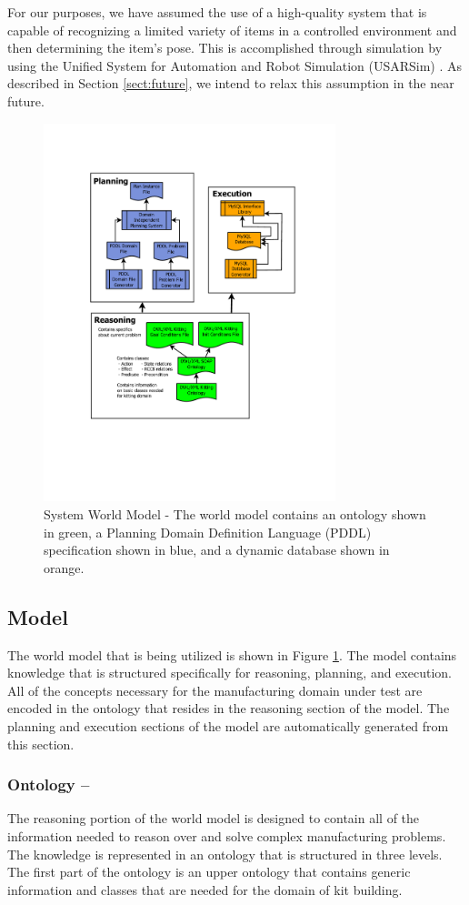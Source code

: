 For our purposes, 
we have assumed the use of a high-quality
system that is capable of recognizing a limited variety of items in a controlled environment and then determining the item's pose. This is accomplished through
simulation by using the Unified System for Automation and Robot Simulation (USARSim) \cite{Balakirsky2007}. As described in Section \ref{sect:future}, 
we intend to relax this assumption in the near future.
%
\begin{figure}[htb!]
\begin{center}
\includegraphics[width=8.5cm]{images/RITAWorldModel.pdf}
\caption{System World Model - The world model contains an ontology shown in green,
a Planning Domain Definition Language (PDDL) specification shown in blue, and a dynamic database shown in orange.}
\label{fig:WorldModel}
\end{center}
\end{figure}
%
\subsection{Model}
\label{subsection:Model}
The world model that is being utilized is shown in Figure \ref{fig:WorldModel}. The model contains knowledge that is structured specifically for
reasoning, planning, and execution. All of the concepts necessary for the manufacturing domain under test are
encoded in the ontology that resides in the reasoning section of the model. The planning and execution sections of the model are automatically generated from
this section.
%
\subsubsection{Ontology --}
\label{sect:Ontology}
The reasoning portion of the world model is designed to contain all of the information needed to reason over and solve complex manufacturing
problems. The knowledge is represented in an ontology that is structured in three levels. The first part of the ontology is an upper ontology
that contains generic information and classes that are needed for the domain of kit building. 

